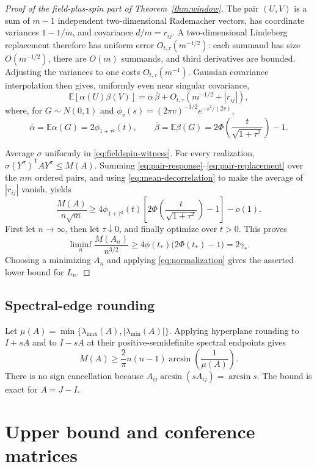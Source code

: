 \documentclass[11pt]{article}
\theoremstyle{definition}
\theoremstyle{remark}
\newcommand{\E}{\mathbb E}
\begin{document}
\begin{proof}[Proof of the field-plus-spin part of
Theorem~\ref{thm:window}]
The pair $(U,V)$ is a sum of $m-1$ independent two-dimensional Rademacher
vectors, has coordinate variances $1-1/m$, and covariance $d/m=r_{ij}$.
A two-dimensional Lindeberg replacement therefore has uniform error
$O_{t,\tau}(m^{-1/2})$: each summand has size $O(m^{-1/2})$, there are
$O(m)$ summands, and third derivatives are bounded.  Adjusting the variances
to one costs $O_{t,\tau}(m^{-1})$.  Gaussian covariance interpolation then
gives, uniformly even near singular covariance,
\begin{equation}\label{eq:pair-replacement}
 \E[\alpha(U)\beta(V)]
 =\overline\alpha\,\overline\beta
  +O_{t,\tau}\!\left(m^{-1/2}+|r_{ij}|\right),
\end{equation}
where, for $G\sim N(0,1)$ and
$\phi_v(s)=(2\pi v)^{-1/2}e^{-s^2/(2v)}$,
\[
 \overline\alpha=\E\alpha(G)=2\phi_{1+\tau^2}(t),
 \qquad
 \overline\beta=\E\beta(G)
 =2\Phi\!\left(\frac{t}{\sqrt{1+\tau^2}}\right)-1.
\]

Average $\sigma$ uniformly in \eqref{eq:fieldspin-witness}.  For every realization,
$\sigma(Y^\sigma)^{\mathsf T}AY^\sigma\le M(A)$.  Summing
\eqref{eq:pair-response}--\eqref{eq:pair-replacement} over the $nm$ ordered
pairs, and using \eqref{eq:mean-decorrelation} to make the average of
$|r_{ij}|$ vanish, yields
\[
 \frac{M(A)}{n\sqrt m}
 \ge
 4\phi_{1+\tau^2}(t)
 \left[
  2\Phi\!\left(\frac{t}{\sqrt{1+\tau^2}}\right)-1
 \right]-o(1).
\]
First let $n\to\infty$, then let $\tau\downarrow0$, and finally optimize
over $t>0$.  This proves
\[
 \liminf_n\frac{M(A_n)}{n^{3/2}}
 \ge4\phi(t_*)\bigl(2\Phi(t_*)-1\bigr)=2\gamma_*.
\]
Choosing a minimizing $A_n$ and applying
\eqref{eq:normalization} gives the asserted lower bound for $L_n$.
\end{proof}

\subsection{Spectral-edge rounding}

Let
$\mu(A)=\min\{\lambda_{\max}(A),|\lambda_{\min}(A)|\}$.  Applying
hyperplane rounding to $I+sA$ and to $I-sA$ at their positive-semidefinite
spectral endpoints gives
\begin{equation}\label{eq:spectral-edge}
 M(A)\ge\frac2\pi n(n-1)\arcsin\!\left(\frac1{\mu(A)}\right).
\end{equation}
There is no sign cancellation because
$A_{ij}\arcsin(sA_{ij})=\arcsin s$.  The bound is exact for $A=J-I$.

\section{Upper bound and conference matrices}
\end{document}
